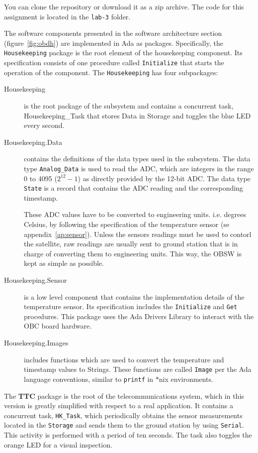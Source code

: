 You can clone the repository or download it as a zip archive.
The code for this assignment is located in the \textcolor{mPurple}{\texttt{lab-3}} folder.

The software components presented in the software architecture section
(figure~\ref{fig:obdh})
are implemented in Ada as packages.
Specifically, the \texttt{Housekeeping} package is the root element of the housekeeping
component.
Its specification consists of one procedure called \texttt{Initialize}
that starts the operation of the component.
The \texttt{Housekeeping} has four subpackages:

\begin{description}
\item[Housekeeping] is the root package of the subsystem and contains a concurrent task, Housekeeping\_Task that stores Data in Storage and toggles the blue LED every second.

\item[Housekeeping.Data] contains the definitions of the data types used in the subsystem. The data type \texttt{Analog\_Data} is used to read the ADC, which are integers in the range 0 to 4095 ($2^{12}-1$) as directly provided by the 12-bit ADC.
The data type \texttt{State} is a record that contains the ADC reading and the corresponding timestamp.

These ADC values have to be converted to engineering units. i.e. degrees Celsius, by following the specification of the temperature sensor (se appendix~\ref{ap:sensor}).
Unless the sensors readings must be used to contorl the satellite,
raw readings are usually sent to ground station
that is in charge of converting them to engineering units.
This way, the OBSW is kept as simple as possible.

\item[Housekeeping.Sensor]  is a low level component
that contains the implementation details of the temperature sensor.
Its specification includes the \texttt{Initialize} and \texttt{Get} procedures.
This package uses the Ada Drivers Library to interact with the OBC board hardware.

\item[Housekeeping.Images] includes functions which are used to convert the temperature and timestamp values to Strings. These functions are called \texttt{Image} per the Ada language conventions,
similar to \texttt{printf} in $\ast$nix environments.
\end{description}

The \textbf{TTC} package is the root of the telecommunications system, which in this version is greatly simplified with respect to a real application.
It contains a concurrent task,
\texttt{HK\_Task},
which periodically obtains the sensor measurements located in the \texttt{Storage} and sends them to the ground station by using \texttt{Serial}.
This activity is performed with a period of ten seconds.
The task also toggles the orange LED for a visual inspection.

